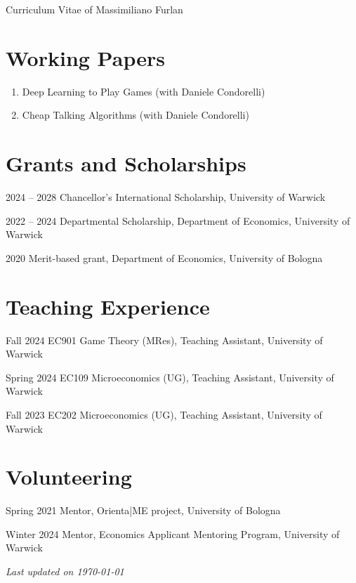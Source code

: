 \documentclass[11pt,a4paper]{article}
\begin{document}
\begin{cv}{\LARGE Curriculum Vitae of Massimiliano Furlan}
\section{Working Papers}
\begin{enumerate}[label=\arabic*., itemsep=0pt, leftmargin=16pt]
    \item Deep Learning to Play Games (with Daniele Condorelli)
    \item Cheap Talking Algorithms (with Daniele Condorelli)
\end{enumerate}
\vspace{-15pt}

\section{Grants and Scholarships}
\begin{cvlist}{}
	\itemsep -4pt
	\item[2024 -- 2028] Chancellor's International Scholarship, University of Warwick 
	\item[2022 -- 2024] Departmental Scholarship, Department of Economics, University of Warwick 
	\item[2020] Merit-based grant, Department of Economics, University of Bologna
\end{cvlist}
\vspace{-15pt}

\section{Teaching Experience}
\begin{cvlist}{}
  	\itemsep -4pt
	\item[Fall 2024] EC901 Game Theory (MRes), Teaching Assistant, University of Warwick
	\item[Spring 2024] EC109 Microeconomics (UG), Teaching Assistant, University of Warwick
	\item[Fall 2023] EC202 Microeconomics (UG), Teaching Assistant, University of Warwick
\end{cvlist}
\vspace{-15pt}

\section{Volunteering}
\begin{cvlist}{}
  	\itemsep -4pt
	\item[Spring 2021] Mentor, Orienta|ME project, University of Bologna
	\item[Winter 2024] Mentor, Economics Applicant Mentoring Program, University of Warwick
\end{cvlist}


\end{cv}

\begin{flushright}
    \textit{Last updated on \today}
\end{flushright}
\end{document}
